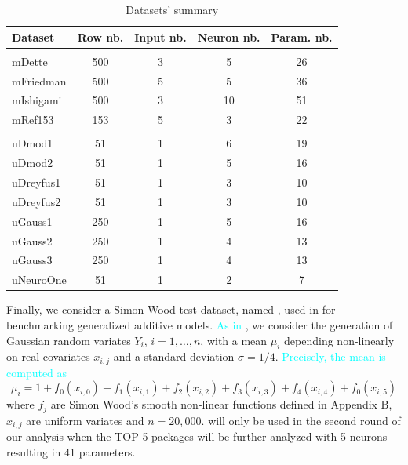 \begin{Schunk}
\begin{table}

\caption{\label{tab:NNdatasets}Datasets' summary}
\centering
\fontsize{7}{9}\selectfont
\begin{tabular}[t]{lcccc}
\toprule
Dataset & Row nb. & Input nb. & Neuron nb. & Param. nb.\\
\midrule
\addlinespace[0.3em]
\multicolumn{5}{l}{\textbf{Multivariate}}\\
\hspace{1em}mDette & 500 & 3 & 5 & 26\\
\hspace{1em}mFriedman & 500 & 5 & 5 & 36\\
\hspace{1em}mIshigami & 500 & 3 & 10 & 51\\
\hspace{1em}mRef153 & 153 & 5 & 3 & 22\\
\addlinespace[0.3em]
\multicolumn{5}{l}{\textbf{Univariate}}\\
\hspace{1em}uDmod1 & 51 & 1 & 6 & 19\\
\hspace{1em}uDmod2 & 51 & 1 & 5 & 16\\
\hspace{1em}uDreyfus1 & 51 & 1 & 3 & 10\\
\hspace{1em}uDreyfus2 & 51 & 1 & 3 & 10\\
\hspace{1em}uGauss1 & 250 & 1 & 5 & 16\\
\hspace{1em}uGauss2 & 250 & 1 & 4 & 13\\
\hspace{1em}uGauss3 & 250 & 1 & 4 & 13\\
\hspace{1em}uNeuroOne & 51 & 1 & 2 & 7\\
\bottomrule
\end{tabular}
\end{table}

\end{Schunk}

Finally, we consider a Simon Wood test dataset, named ,
used in \citep{wood2011fast} for benchmarking generalized additive
models. \textcolor{cyan}{As in \citep{wood2011fast}}, we consider the
generation of Gaussian random variates \(Y_i\), \(i=1,\dots,n\), with a
mean \(\mu_i\) depending non-linearly on real covariates \(x_{i,j}\) and
a standard deviation \(\sigma=1/4\).
\textcolor{cyan}{Precisely, the mean is computed as} \[
\mu_i = 1+ f_0(x_{i,0})+f_1(x_{i,1})+f_2(x_{i,2})+f_3(x_{i,3})
+f_4(x_{i,4})+f_0(x_{i,5})
\] where \(f_j\) are Simon Wood's smooth non-linear functions defined in
Appendix B, \(x_{i,j}\) are uniform variates and \(n=20,000\).
 will only be used in the second round of our analysis
when the TOP-5 packages will be further analyzed with 5 neurons
resulting in 41 parameters.

